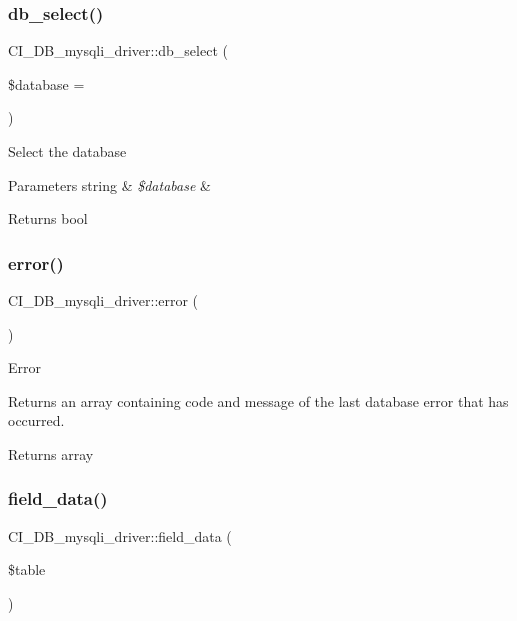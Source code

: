 \subsubsection{\texorpdfstring{db\+\_\+select()}{db\_select()}}
{\footnotesize\ttfamily C\+I\+\_\+\+D\+B\+\_\+mysqli\+\_\+driver\+::db\+\_\+select (\begin{DoxyParamCaption}\item[{}]{\$database = {\ttfamily \textquotesingle{}\textquotesingle{}} }\end{DoxyParamCaption})}

Select the database


\begin{DoxyParams}[1]{Parameters}
string & {\em \$database} & \\
\hline
\end{DoxyParams}
\begin{DoxyReturn}{Returns}
bool 
\end{DoxyReturn}
\mbox{\label{class_c_i___d_b__mysqli__driver_a476e6c22ebf261f496c03afa4d98af3c}} 
\subsubsection{\texorpdfstring{error()}{error()}}
{\footnotesize\ttfamily C\+I\+\_\+\+D\+B\+\_\+mysqli\+\_\+driver\+::error (\begin{DoxyParamCaption}{ }\end{DoxyParamCaption})}

Error

Returns an array containing code and message of the last database error that has occurred.

\begin{DoxyReturn}{Returns}
array 
\end{DoxyReturn}
\mbox{\label{class_c_i___d_b__mysqli__driver_a9ba0959253b80d6fd2b48724d4fbeb1d}} 
\subsubsection{\texorpdfstring{field\+\_\+data()}{field\_data()}}
{\footnotesize\ttfamily C\+I\+\_\+\+D\+B\+\_\+mysqli\+\_\+driver\+::field\+\_\+data (\begin{DoxyParamCaption}\item[{}]{\$table }\end{DoxyParamCaption})}


